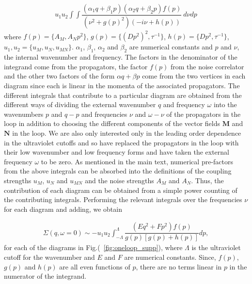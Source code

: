 \documentclass[prl,aps,twocolumn,nosuperscriptaddress,bibnotes,notitlepage,nofootinbib]{revtex4-2}
\newcommand{\magg}{\mathbf{M}}
\newcommand{\stagg}{\mathbf{N}}
\begin{document}
\begin{align*}
    u_1 u_2 \int \int \dfrac{(\alpha_1 q + \beta_1 p)(\alpha_2 q + \beta_2 p)f(p)}{(\nu^2 + g(p)^2)(-i \nu + h(p))}~d\nu dp
\end{align*}
where $f(p)= \{A_M, A_N p^2 \}$, $g(p)= \{(Dp^2)^2,  \tau^{-1}\}$, $h(p)= \{Dp^2 , \tau^{-1}\}$, $u_1, u_2 = \{u_M, u_N, u_{MN} \}$. $\alpha_1$, $\beta_1$, $\alpha_2$ and $\beta_2$ are numerical constants and $p$ and $\nu$, the internal wavenumber and frequency. The factors in the denominator of the integrand come from the propagators, the factor $f(p)$ from the noise correlator and the other two factors of the form $\alpha q + \beta p$ come from the two vertices in each diagram since each is linear in the momenta of the associated propagators. The different integrals that contribute to a particular diagram are obtained from the different ways of dividing the external wavenumber $q$ and frequency $\omega$ into the wavenumbers $p$ and $q-p$ and frequencies $\nu$ and $\omega-\nu$ of the propagators in the loop in addition to choosing the different components of the vector fields $\magg$ and $\stagg$ in the loop. We are also only interested only in the leading order dependence in the ultraviolet cutoffs and so have replaced the propagators in the loop with their low wavenumber and low frequency forms and have taken the external frequency $\omega$ to be zero. As mentioned in the main text, numerical pre-factors from the above integrals can be absorbed into the definitions of the coupling strengths $u_M$, $u_N$ and $u_{MN}$ and the noise strengths $A_M$ and $A_N$. Thus, the contribution of each diagram can be obtained from a simple power counting of the contributing integrals. Performing the relevant integrals over the frequencies $\nu$ for each diagram and adding, we obtain 

\begin{align}
\label{eqn:loop_int}
   \Sigma (q,\omega=0) \sim - u_1 u_2 \int_{-\Lambda}^\Lambda \dfrac{(Eq^2 + Fp^2)f(p)}{g(p) \left[g(p)+h(p)\right]}dp,
\end{align}
for each of the diagrams in Fig.(~\ref{fig:oneloop_supp}), where $\Lambda$ is the ultraviolet cutoff for the wavenumber and $E$ and $F$ are numerical constants. Since, $f(p)$, $g(p)$ and $h(p)$ are all even functions of $p$, there are no terms linear in $p$ in the numerator of the integrand. 
\end{document}
